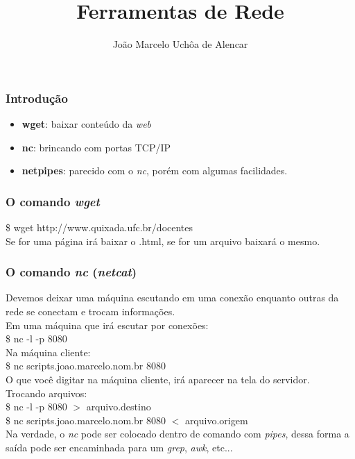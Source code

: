 \documentclass{beamer}
\title{Ferramentas de Rede}
\author[João Marcelo Uchôa de Alencar]{João Marcelo Uchôa de Alencar}
\institute{Universidade Federal do Ceará - Quixadá}
\begin{document}
   \begin{frame}
      \titlepage
   \end{frame}

   \begin{frame}
      \frametitle{Introdução}
      \begin{itemize}
         \item \textbf{wget}: baixar conteúdo da \textit{web}
	 \item \textbf{nc}: brincando com portas TCP/IP
	 \item \textbf{netpipes}: parecido com o \textit{nc}, porém com algumas facilidades. 
      \end{itemize}
   \end{frame}


   \begin{frame}
      \frametitle{O comando \textit{wget}}
      \$ wget http://www.quixada.ufc.br/docentes \\
      Se for uma página irá baixar o .html, se for um arquivo baixará o mesmo.
   \end{frame}


   \begin{frame}
      \frametitle{O comando \textit{nc} (\textit{netcat})}
      Devemos deixar uma máquina escutando em uma conexão enquanto outras da rede se conectam e trocam informações. \\
      Em uma máquina que irá escutar por conexões: \\
      \$ nc -l -p 8080 \\
      Na máquina cliente: \\
      \$ nc scripts.joao.marcelo.nom.br 8080 \\
      O que você digitar na máquina cliente, irá aparecer na tela do servidor. \\
      Trocando arquivos: \\
      \$ nc -l -p 8080 $>$ arquivo.destino \\
      \$ nc scripts.joao.marcelo.nom.br 8080 $<$ arquivo.origem \\
      Na verdade, o \textit{nc} pode ser colocado dentro de comando com \textit{pipes}, dessa forma a saída pode ser encaminhada para um \textit{grep}, \textit{awk}, etc...
   \end{frame}
\end{document}

